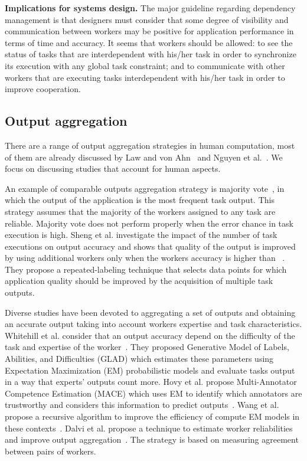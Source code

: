 \documentclass[11pt]{bmc_article_s50}
\begin{document}
\textbf{Implications for systems design.} The major guideline regarding dependency management is that designers must consider that some degree of visibility and communication between workers may be positive for application performance in terms of time and accuracy. It seems that workers should be allowed:  to see the status of tasks that are interdependent with his/her task in order to synchronize its execution with any global task constraint; and  to communicate with other workers that are executing tasks interdependent with his/her task in order to improve cooperation.

\subsection{Output aggregation}

There are a range of output aggregation strategies in human computation, most of them are already discussed by Law and von Ahn~\cite{Law:Book:2011} and Nguyen et al.~\cite{Nguyen:WISE:2013}. We focus on discussing studies that account for human aspects.

An example of comparable outputs aggregation strategy is majority vote~\cite{Barowy:2012,Little2010}, in which the output of the application is the most frequent task output. This strategy assumes that the majority of the workers assigned to any task are reliable. Majority vote does not perform properly when the error chance in task execution is high. Sheng et al. investigate the impact of the number of task executions on output accuracy and shows that quality of the output is improved by using additional workers only when the workers accuracy is higher than ~\cite{Sheng:KDD:2008}. They propose a repeated-labeling technique that selects data points for which application quality should be improved by the acquisition of multiple task outputs.

Diverse studies have been devoted to aggregating a set of outputs and obtaining an accurate output taking into account workers expertise and task characteristics. Whitehill et al. consider that an output accuracy depend on the difficulty of the task and expertise of the worker~\cite{whitehill:ANIPS:2009}. They proposed Generative Model of Labels, Abilities, and Difficulties (GLAD) which estimates these parameters using Expectation Maximization (EM) probabilistic models and evaluate tasks output in a way that experts' outputs count more. Hovy et al. propose Multi-Annotator Competence Estimation (MACE) which uses EM to identify which annotators are trustworthy and considers this information to predict outputs~\cite{Hovy:NAACL-HLT:2013}. Wang et al. propose a recursive algorithm to improve the efficiency of compute EM models in these contexts~\cite{Wang:2013}. {\color{black}Dalvi et al. propose a technique to estimate worker reliabilities and improve output aggregation~\cite{Dalvi:2013}. The strategy is based on measuring agreement between pairs of workers.}
\end{document}
